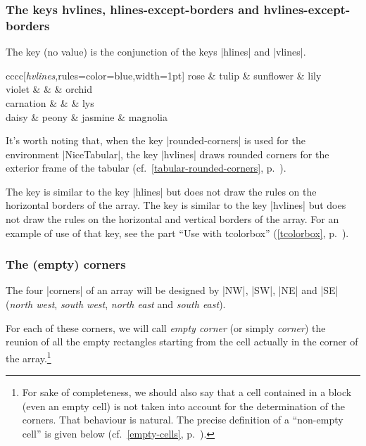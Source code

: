 \documentclass[dvipsnames]{article}
\begin{document}
\subsubsection{The keys hvlines,  hlines-except-borders and hvlines-except-borders}
\label{hvlines}



The key  (no value) is the conjunction of the keys |hlines|
and |vlines|.

\smallskip
\begin{Code}
\begin{NiceTabular}{cccc}[\emph{hvlines},rules={color=blue,width=1pt}]
  rose      & tulip & sunflower & lily \\
  violet    &  & & orchid \\
  carnation & & & lys \\
  daisy     & peony & jasmine & magnolia 
\end{NiceTabular}
\end{Code}


\bigskip
It's worth noting that, when the key |rounded-corners| is used for the
environment |{NiceTabular}|, the key |hvlines| draws rounded corners for the
exterior frame of the tabular (cf.~\ref{tabular-rounded-corners},
p.~\pageref{tabular-rounded-corners}).

\bigskip
The key  is similar to the key |hlines| but
does not draw the rules on the horizontal borders of the array. The key
 is similar to the key |hvlines| but does not
draw the rules on the horizontal and vertical borders of the array. For an
example of use of that key, see the part ``Use with tcolorbox''
(\ref{tcolorbox}, p.~\pageref{tcolorbox}).

\subsubsection{The (empty) corners}

\label{corners}

The four |corners| of an array will be designed by |NW|, |SW|, |NE| and |SE|
(\emph{north west}, \emph{south west}, \emph{north east} and \emph{south east}).

For each of these corners, we will call \emph{empty corner} (or simply
\emph{corner}) the reunion of all the empty rectangles starting from the cell
actually in the corner of the array.\footnote{For sake of completeness, we
should also say that a cell contained in a block (even an empty cell) is not
taken into account for the determination of the corners. That behaviour is
natural. The precise definition of a ``non-empty cell'' is given below (cf.~\ref{empty-cells},
p.~\pageref{empty-cells}).}
\end{document}
